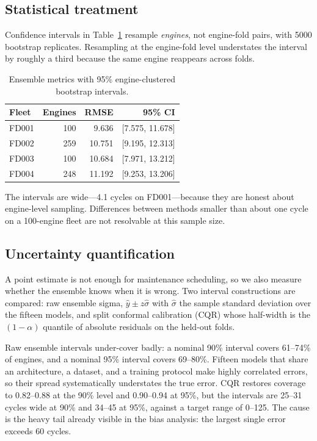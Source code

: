 \documentclass[journal,10pt]{IEEEtran}
\begin{document}
\subsection{Statistical treatment}

Confidence intervals in Table~\ref{tab:ci} resample \emph{engines}, not engine-fold
pairs, with 5000 bootstrap replicates. Resampling at the engine-fold level
understates the interval by roughly a third because the same engine reappears
across folds.

\begin{table}[t]
\centering
\caption{Ensemble metrics with 95\% engine-clustered bootstrap intervals.}
\label{tab:ci}
\small
\begin{tabular}{lrrr}
\toprule
Fleet & Engines & RMSE & 95\% CI \\
\midrule
FD001 & 100 & 9.636 & [7.575, 11.678] \\
FD002 & 259 & 10.751 & [9.195, 12.313] \\
FD003 & 100 & 10.684 & [7.971, 13.212] \\
FD004 & 248 & 11.192 & [9.253, 13.206] \\
\bottomrule
\end{tabular}
\end{table}

The intervals are wide---4.1 cycles on FD001---because they are honest about
engine-level sampling. Differences between methods smaller than about one cycle on
a 100-engine fleet are not resolvable at this sample size.

\subsection{Uncertainty quantification}

A point estimate is not enough for maintenance scheduling, so we also measure
whether the ensemble knows when it is wrong. Two interval constructions are
compared: raw ensemble sigma, $\hat y\pm z\hat\sigma$ with $\hat\sigma$ the
sample standard deviation over the fifteen models, and split conformal
calibration (CQR) whose half-width is the $(1-\alpha)$ quantile of absolute
residuals on the held-out folds.

Raw ensemble intervals under-cover badly: a nominal 90\% interval covers
61--74\% of engines, and a nominal 95\% interval covers 69--80\%. Fifteen
models that share an architecture, a dataset, and a training protocol make
highly correlated errors, so their spread systematically understates the true
error. CQR restores coverage to 0.82--0.88 at the 90\% level and 0.90--0.94 at
95\%, but the intervals are 25--31 cycles wide at 90\% and 34--45 at 95\%,
against a target range of 0--125. The cause is the heavy tail already visible
in the bias analysis: the largest single error exceeds 60 cycles.
\end{document}
